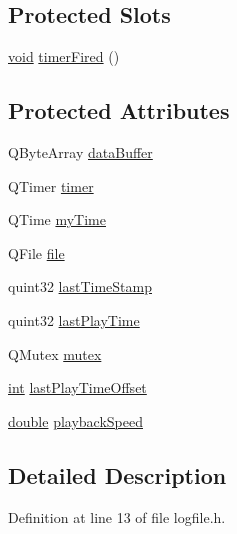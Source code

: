 \subsection*{Protected Slots}
\begin{DoxyCompactItemize}
\item 
\hyperlink{group___u_a_v_objects_plugin_ga444cf2ff3f0ecbe028adce838d373f5c}{void} \hyperlink{class_log_file_a7e66e2f2b6fc330107d8a87e045cd1fd}{timer\-Fired} ()
\end{DoxyCompactItemize}
\subsection*{Protected Attributes}
\begin{DoxyCompactItemize}
\item 
Q\-Byte\-Array \hyperlink{class_log_file_ab722d4f0315c5d3cc71b6b5a8b722fa0}{data\-Buffer}
\item 
Q\-Timer \hyperlink{class_log_file_a0d87ba8e55632876b82a820c895ad549}{timer}
\item 
Q\-Time \hyperlink{class_log_file_ac0bbc6cc818c7e061a98b586f967d8da}{my\-Time}
\item 
Q\-File \hyperlink{class_log_file_a2082be2198b8903edeb0bfc83d69dbac}{file}
\item 
quint32 \hyperlink{class_log_file_aef839a3a5211389d9d302206012d4402}{last\-Time\-Stamp}
\item 
quint32 \hyperlink{class_log_file_a98c760fc9057395fcc4ac51557de91bb}{last\-Play\-Time}
\item 
Q\-Mutex \hyperlink{class_log_file_a879a7dd05d179c71f683f39106cb3c8f}{mutex}
\item 
\hyperlink{ioapi_8h_a787fa3cf048117ba7123753c1e74fcd6}{int} \hyperlink{class_log_file_aa035b77c73dbb55b3e37108f377ba657}{last\-Play\-Time\-Offset}
\item 
\hyperlink{_super_l_u_support_8h_a8956b2b9f49bf918deed98379d159ca7}{double} \hyperlink{class_log_file_a353850a88290b049a84fc18783a99099}{playback\-Speed}
\end{DoxyCompactItemize}


\subsection{Detailed Description}


Definition at line 13 of file logfile.\-h.



